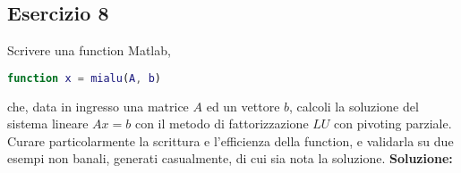 \subsection{Esercizio 8}
Scrivere una function Matlab,
\begin{lstlisting}[language=Matlab]
    function x = mialu(A, b)
\end{lstlisting}
che, data in ingresso una matrice $A$ ed un vettore $b$, calcoli la soluzione
del sistema lineare $Ax = b$ con il metodo di fattorizzazione $LU$ con pivoting parziale.
Curare particolarmente la scrittura e l'efficienza della function,
e validarla su due esempi non banali, generati casualmente,
di cui sia nota la soluzione.
\newline \textbf{Soluzione:}
